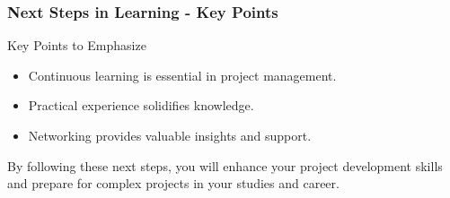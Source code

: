 \documentclass[aspectratio=169]{beamer}
\begin{document}
\begin{frame}[fragile]
    \frametitle{Next Steps in Learning - Key Points}
    \begin{block}{Key Points to Emphasize}
        \begin{itemize}
            \item Continuous learning is essential in project management.
            \item Practical experience solidifies knowledge.
            \item Networking provides valuable insights and support.
        \end{itemize}
    \end{block}
    By following these next steps, you will enhance your project development skills and prepare for complex projects in your studies and career.
\end{frame}
\end{document}
